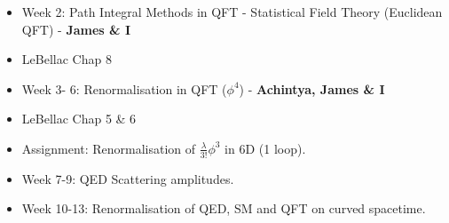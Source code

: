 
\begin{itemize}
    \item Week 2: Path Integral Methods in QFT - Statistical Field Theory (Euclidean QFT) - \textbf{James \& I}
    \item LeBellac Chap 8
    \item Week 3- 6: Renormalisation in QFT ($\phi^{4}$) - \textbf{Achintya, James \& I}
    \item LeBellac Chap 5 \& 6
    \item Assignment: Renormalisation of $\frac{\lambda}{3!} \phi^{3}$ in 6D (1 loop).
    \item Week 7-9: QED Scattering amplitudes.
    \item Week 10-13: Renormalisation of QED, SM and QFT on curved spacetime.
\end{itemize}

